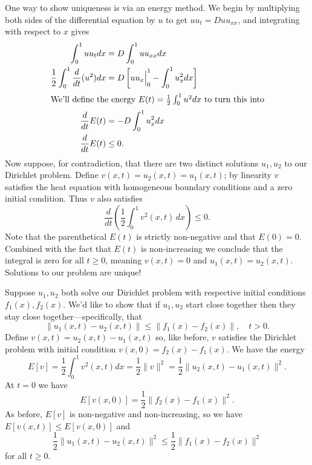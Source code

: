 \documentclass[../m180main.tex]{subfiles}
\begin{document}
\begin{example}[Uniqueness]
    One way to show uniqueness is via an energy method.
    We begin by multiplying both sides of the differential equation by $u$ to get $uu_t = D uu_{xx}$, and integrating with respect to $x$ gives
    \begin{align*}
        \int_{0}^{1} uu_t dx &= D \int_{0}^{1} uu_{xx} dx \\
        \frac{1}{2} \int_{0}^{1} \frac{d}{dt} (u^2) dx &= D \left[ uu_x \Big|_0^1 - \int_{0}^{1} u_x^2 dx \right] \\
        \intertext{We'll define the energy $E(t) = \frac{1}{2} \int_{0}^{1} u^2 dx$ to turn this into}
        \frac{d}{dt} E(t) &= -D \int_{0}^{1} u_x^2 dx \\
        \frac{d}{dt} E(t) &\leq 0.
    \end{align*}
    Now suppose, for contradiction, that there are two distinct solutions $u_1, u_2$ to our Dirichlet problem.
    Define $v(x,t) = u_2(x,t) = u_1(x,t)$; by linearity $v$ satisfies the heat equation with homogeneous boundary conditions and a zero initial condition.
    Thus $v$ also satisfies
    \[ \frac{d}{dt} \left( \frac{1}{2} \int_{0}^{1} v^2(x,t) \,dx \right) \leq 0. \]
    Note that the parenthetical $E(t)$ is strictly non-negative and that $E(0) = 0$.
    Combined with the fact that $E(t)$ is non-increasing we conclude that the integral is zero for all $t \geq 0$, meaning $v(x,t) = 0$ and $u_1(x,t) = u_2(x,t)$.
    Solutions to our problem are unique!
\end{example}

\begin{example}[Stability]
    Suppose $u_1, u_2$ both solve our Dirichlet problem with respective initial conditions $f_1(x), f_2(x)$.
    We'd like to show that if $u_1, u_2$ start close together then they stay close together---specifically, that
    \[ \| u_1(x,t) - u_2(x,t) \| \leq \| f_1(x) - f_2(x) \|, \quad t > 0. \]
    Define $v(x,t) = u_2(x,t) - u_1(x,t)$ so, like before, $v$ satisfies the Dirichlet problem with initial condition $v(x,0) = f_2(x) - f_1(x)$.
    We have the energy
    \[ E[v] = \frac{1}{2} \int_{0}^{1} v^2(x,t) dx = \frac{1}{2} \| v \|^2 = \frac{1}{2} \| u_2(x,t) - u_1(x,t) \|^2. \]
    At $t=0$ we have \vspace{-5pt}
    \[ E[v(x,0)] = \frac{1}{2} \| f_2(x) - f_1(x) \|^2. \]
    As before, $E[v]$ is non-negative and non-increasing, so we have $E[v(x,t)] \leq E[v(x,0)]$ and
    \[ \frac{1}{2} \| u_1(x,t) - u_2(x,t) \|^2 \leq \frac{1}{2} \| f_1(x) - f_2(x) \|^2 \]
    for all $t \geq 0$.
\end{example}
\end{document}
